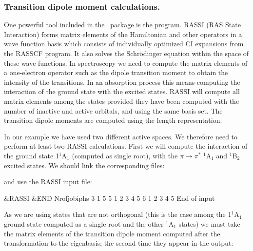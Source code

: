 \subsubsection{Transition dipole moment calculations.}
\label{TUT:sec:rassi_thio}


One powerful tool included in the \molcas\ package is the  program.
RASSI (RAS State Interaction) forms matrix elements of the Hamiltonian
and other operators in a wave function basis which consists of
individually optimized CI expansions from the RASSCF program. 
It also solves the Schr\"odinger equation within the space of these
wave functions. In spectroscopy we need to compute the matrix elements
of a one-electron operator such as the dipole transition moment
to obtain the intensity of the transitions. In an absorption process
this means computing the interaction of the ground state with the
excited states. RASSI will compute all matrix elements among the
states provided they have been computed with the number of inactive
and active orbitals, and using the same basis set.
The transition dipole moments are computed using the length
representation.

In our example we have used two different active spaces. 
We therefore need to perform at least two RASSI calculations. 
First we will compute the interaction of the ground
state 1$^1$A$_1$ (computed as single root), with the $\pi\to\pi^*$
$^1$A$_1$ and $^1$B$_2$ excited states. We should link the corresponding
 files:



and use the RASSI input file:

\begin{inputlisting}
 &RASSI &END
Nrofjobiphs
 3 1 5 5
  1
  2 3 4 5 6
  1 2 3 4 5
End of input
\end{inputlisting}

As we are using states that are not orthogonal (this is the case
among the 1$^1$A$_1$ ground state computed as a single root and
the other $^1$A$_1$ states) we must take the matrix elements
of the transition dipole moment computed after the transformation
to the eigenbasis; the second time they appear in the
output:

